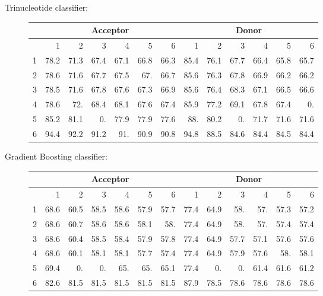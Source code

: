 \documentclass[10pt]{beamer}
\begin{document}
\begin{frame}
	Trinucleotide classifier:
	\begin{figure}
		\scriptsize
		\begingroup
		\centering
		\def\arraystretch{1.1}
		\begin{tabular}{|r|r|r|r|r|r|r|r|r|r|r|r|r|}
			\hline
			&\multicolumn{6}{c|}{Acceptor}&\multicolumn{6}{c|}{Donor}\\
			\hline
			&1&2&3&4&5&6&1&2&3&4&5&6\\
			\hline
			1&78.2&71.3&67.4&67.1&66.8&66.3&85.4&76.1&67.7&66.4&65.8&65.7\\
			2&78.6&71.6&67.7&67.5&67. &66.7&85.6&76.3&67.8&66.9&66.2&66.2\\
			3&78.5&71.6&67.8&67.6&67.3&66.9&85.6&76.4&68.3&67.1&66.5&66.6\\
			4&78.6&72. &68.4&68.1&67.6&67.4&85.9&77.2&69.1&67.8&67.4& 0. \\
			5&85.2&81.1& 0. &77.9&77.9&77.6&88. &80.2& 0. &71.7&71.6&71.6\\
			6&94.4&92.2&91.2&91. &90.9&90.8&94.8&88.5&84.6&84.4&84.5&84.4\\
			
			\hline 
		\end{tabular}
		\endgroup	
	\end{figure}

	Gradient Boosting classifier:
	\begin{figure}
		\scriptsize
		\begingroup
		\centering
		\def\arraystretch{1.1}
		\begin{tabular}{|r|r|r|r|r|r|r|r|r|r|r|r|r|}
			\hline
			&\multicolumn{6}{c|}{Acceptor}&\multicolumn{6}{c|}{Donor}\\
			\hline
			&1&2&3&4&5&6&1&2&3&4&5&6\\
			\hline
			1&68.6&60.5&58.5&58.6&57.9&57.7&77.4&64.9&58. &57. &57.3&57.2\\
			2&68.6&60.7&58.6&58.6&58.1&58. &77.4&64.9&58. &57. &57.4&57.4\\
			3&68.6&60.4&58.5&58.4&57.9&57.8&77.4&64.9&57.7&57.1&57.6&57.6\\
			4&68.6&60.1&58.1&58.1&57.7&57.4&77.4&64.9&57.9&57.6&58. &58.1\\
			5&69.4& 0. & 0. &65. &65. &65.1&77.4& 0. & 0. &61.4&61.6&61.2\\
			6&82.6&81.5&81.5&81.5&81.5&81.5&87.9&78.5&78.6&78.6&78.6&78.6\\
			
			\hline 
		\end{tabular}
		\endgroup	
	\end{figure}
\end{frame}
\end{document}
